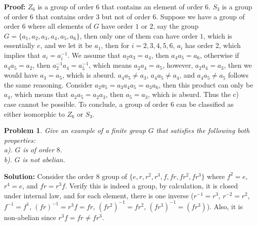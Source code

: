 \documentclass[12pt]{article}
\newtheorem{problem}{Problem}
\begin{document}
\textbf{Proof:} $Z_{6}$ is a group of order $6$ that contains an element of order $6$. $S_{3}$ is a group of order $6$ that contains order $3$ but not of order $6$. Suppose we have a group of order $6$ where all elements of $G$ have order $1$ or $2$, say the group $G = \{a_{1}, a_{2}, a_{3}, a_{4}, a_{5}, a_{6}\}$, then only one of them can have order $1$, which is essentially $e$, and we let it be $a_{1}$, then for $i=2, 3, 4, 5, 6$, $a_{i}$ has order 2, which implies that $a_{i} = a_{i}^{-1}$. We assume that $a_{2}a_{3} = a_{4}$, then $a_{4}a_{5}=a_{6}$, otherwise if $a_{4}a_{5} = a_{2}$, then $a_{2}^{-1}a_{4} = a_{5}^{-1}$, which means $a_{2}a_{4}=a_{5}$, however, $a_{2}a_{4} = a_{3}$, then we would have $a_{3} = a_{5}$, which is absurd. $a_{4}a_{5}\neq a_{3}$, $a_{4}a_{5}\neq a_{4}$, and $a_{4}a_{5}\neq a_{5}$ follows the same reasoning. Consider $a_{2}a_{5}=a_{3}a_{4}a_{5}=a_{3}a_{6}$, then this product can only be $a_{4}$, which means that $a_{2}a_{5}=a_{2}a_{3}$, then $a_{5}=a_{3}$, which is absurd. Thus the c) case cannot be possible. To conclude, a group of order $6$ can be classified as either isomorphic to $Z_{6}$ or $S_{3}$. 

\begin{problem}
Give an example of a finite group $G$ that satisfies the following both properties: \\
\indent a). $G$ is of order $8$. \\
\indent b). $G$ is not abelian.
\end{problem}

\textbf{Solution:} Consider the order 8 group of $\{e, r, r^2, r^3, f, fr, fr^2, fr^3\}$ where $f^2 = e$, $r^4 = e$, and $fr = r^3f$. Verify this is indeed a group, by calculation, it is closed under internal law, and for each element, there is one inverse ($r^{-1} = r^3$, $r^{-2} = r^{2}$, $f^{-1} = f^{1}$, $(fr)^{-1} = r^{3}f= fr$, $(fr^{2})^{-1} = fr^2$, $(fr^{3})^{-1} = (fr^3)$). Also, it is non-abelian since $r^3f = fr\neq fr^3$.
\end{document}

